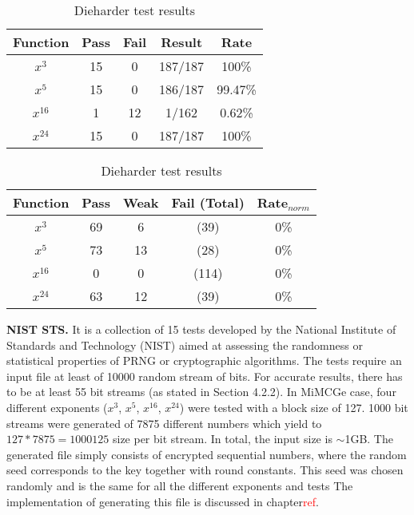 \documentclass{Resources/UoBLab1}
\theoremstyle{definition}
\begin{document}
\begin{table}[]
    \begin{minipage}{.5\textwidth}
        \centering
        \begin{tabular}{|c|c|c|c|c|}
            \hline
            Function & Pass & Fail & Result & Rate \\
            \hline
            $x^3$ & 15 & 0 & 187/187 & 100\% \\
            $x^5$ & 15 & 0 & 186/187 & 99.47\% \\
            $x^{16}$ & 1 & 12 & 1/162 & 0.62\% \\
            $x^{24}$ & 15 & 0 & 187/187 & 100\% \\
            \hline
        \end{tabular}
        \caption{NIST test results}\label{tab:NIST-results}
    \end{minipage}%
    \begin{minipage}{.5\textwidth}
        \centering
        \begin{tabular}{|c|c|c|c|c|}
            \hline
            Function & Pass & Weak & Fail (Total) & Rate$_{norm}$ \\
            \hline
            $x^3$ & 69 & 6 & (39) & 0\%\\
            $x^5$ & 73 & 13 & (28) & 0\% \\
            $x^{16}$ & 0 & 0 & (114) & 0\% \\
            $x^{24}$ & 63 & 12 & (39) & 0\% \\
            \hline
        \end{tabular}
        \caption{Dieharder test results}\label{tab:dieharder-results}
    \end{minipage}
\end{table}

\noindent\textbf{NIST STS.} It is a collection of 15 tests developed by the National Institute of Standards and Technology (NIST) aimed at assessing the randomness or statistical properties of PRNG or cryptographic algorithms. The tests require an input file at least of 10000 random stream of bits. For accurate results, there has to be at least 55 bit streams (as stated in Section 4.2.2\cite{NIST}). In MiMCGe case, four different exponents ($x^3$, $x^5$, $x^{16}$, $x^{24}$) were tested with a block size of 127. 1000 bit streams were generated of 7875 different numbers which yield to $127 * 7875 = 1000125$ size per bit stream. In total, the input size is $\sim$1GB. The generated file simply consists of encrypted sequential numbers, where the random seed corresponds to the key together with round constants. This seed was chosen randomly and is the same for all the different exponents and tests The implementation of generating this file is discussed in chapter\textcolor{red}{ref}.
\end{document}
